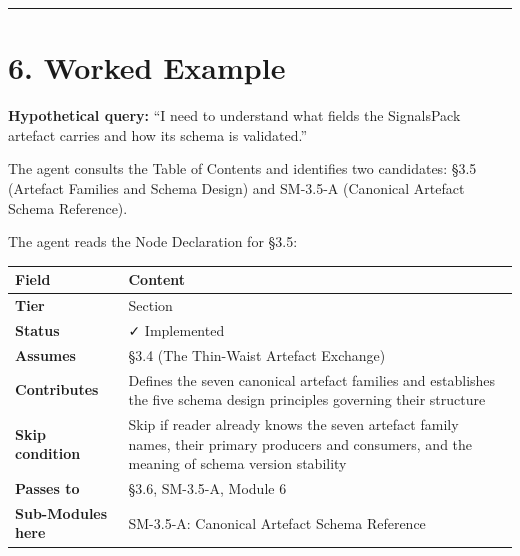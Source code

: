 \documentclass[
  11pt,
  a4paper,
  twoside,
  openright]{scrbook}
\newcounter{none} %
\begin{document}
\begin{center}\rule{0.5\linewidth}{0.5pt}\end{center}

\section{6. Worked Example}\label{worked-example}

\textbf{Hypothetical query:} ``I need to understand what fields the
SignalsPack artefact carries and how its schema is validated.''

The agent consults the Table of Contents and identifies two candidates:
§3.5 (Artefact Families and Schema Design) and SM-3.5-A (Canonical
Artefact Schema Reference).

The agent reads the Node Declaration for §3.5:

\begin{tcolorbox}[enhanced jigsaw, arc=.35mm, bottomrule=.15mm, bottomtitle=1mm, breakable, colback=white, colbacktitle=quarto-callout-note-color!10!white, colframe=quarto-callout-note-color-frame, coltitle=black, left=2mm, leftrule=.75mm, opacityback=0, opacitybacktitle=0.6, rightrule=.15mm, title={Node Declaration --- §3.5 Artefact Families and Schema Design}, titlerule=0mm, toprule=.15mm, toptitle=1mm]

{\def\LTcaptype{none} %
\begin{longtable}[]{@{}
  >{\raggedright\arraybackslash}p{}
  >{\raggedright\arraybackslash}p{}@{}}
\toprule\noalign{}
\begin{minipage}[b]{\linewidth}\raggedright
Field
\end{minipage} & \begin{minipage}[b]{\linewidth}\raggedright
Content
\end{minipage} \\
\midrule\noalign{}
\endhead
\bottomrule\noalign{}
\endlastfoot
\textbf{Tier} & Section \\
\textbf{Status} & ✓ Implemented \\
\textbf{Assumes} & §3.4 (The Thin-Waist Artefact Exchange) \\
\textbf{Contributes} & Defines the seven canonical artefact families and
establishes the five schema design principles governing their
structure \\
\textbf{Skip condition} & Skip if reader already knows the seven
artefact family names, their primary producers and consumers, and the
meaning of schema version stability \\
\textbf{Passes to} & §3.6, SM-3.5-A, Module 6 \\
\textbf{Sub-Modules here} & SM-3.5-A: Canonical Artefact Schema
Reference \\
\end{longtable}
}

\end{tcolorbox}
\end{document}
